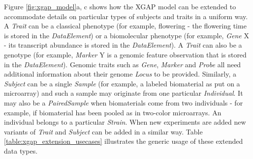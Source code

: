 Figure \ref{fig:xgap_model}a, c shows how the XGAP model can be extended to accommodate details on particular types of subjects and traits in a uniform way.
A \textsl{Trait} can be a classical phenotype (for example, flowering - the flowering time is stored in the \textsl{DataElement}) or a biomolecular phenotype (for example, \textsl{Gene} X - its transcript abundance is stored in the \textsl{DataElement}).
A \textsl{Trait} can also be a genotype (for example, \textsl{Marker} Y is a genomic feature observation that is stored in the \textsl{DataElement}).
Genomic traits such as \textsl{Gene}, \textsl{Marker} and \textsl{Probe} all need additional information about their genome \textsl{Locus} to be provided.
Similarly, a \textsl{Subject} can be a single \textsl{Sample} (for example, a labeled biomaterial as put on a microarray) and such a sample may originate from one particular \textsl{Individual}.
It may also be a \textsl{PairedSample} when biomaterials come from two individuals - for example, if biomaterial has been pooled as in two-color microarrays.
An individual belongs to a particular \textsl{Strain}.
When new experiments are added new variants of \textsl{Trait} and \textsl{Subject} can be added in a similar way.
Table \ref{table:xgap_extension_usecases} illustrates the generic usage of these extended data types.

